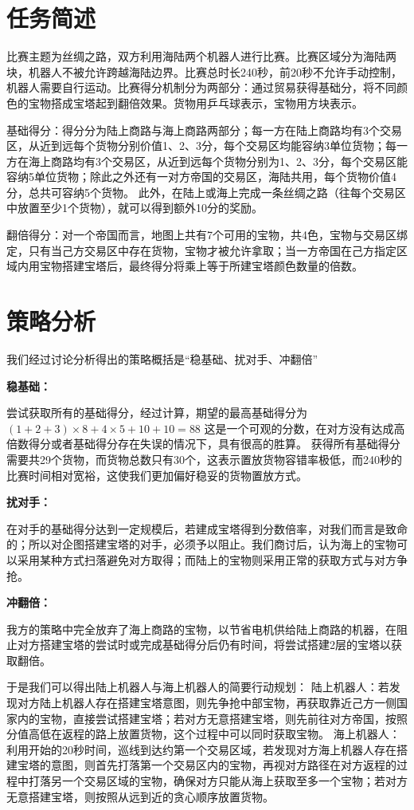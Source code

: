 \documentclass{Robot}
\date{\today}
\begin{document}
    \makecover
 
    \section{任务简述}

    比赛主题为丝绸之路，双方利用海陆两个机器人进行比赛。比赛区域分为海陆两块，机器人不被允许跨越海陆边界。比赛总时长240秒，前20秒不允许手动控制，机器人需要自行运动。比赛得分机制分为两部分：通过贸易获得基础分，将不同颜色的宝物搭成宝塔起到翻倍效果。货物用乒乓球表示，宝物用方块表示。
    \par
    基础得分：得分分为陆上商路与海上商路两部分；每一方在陆上商路均有3个交易区，从近到远每个货物分别价值1、2、3分，每个交易区均能容纳3单位货物；每一方在海上商路均有3个交易区，从近到远每个货物分别为1、2、3分，每个交易区能容纳5单位货物；除此之外还有一对方帝国的交易区，海陆共用，每个货物价值4分，总共可容纳5个货物。
    此外，在陆上或海上完成一条丝绸之路（往每个交易区中放置至少1个货物），就可以得到额外10分的奖励。
    \par
    翻倍得分：对一个帝国而言，地图上共有7个可用的宝物，共4色，宝物与交易区绑定，只有当己方交易区中存在货物，宝物才被允许拿取；当一方帝国在己方指定区域内用宝物搭建宝塔后，最终得分将乘上等于所建宝塔颜色数量的倍数。

    \section{策略分析}

    我们经过讨论分析得出的策略概括是“稳基础、扰对手、冲翻倍”
    \par
    \textbf{稳基础：}
    \par
    尝试获取所有的基础得分，经过计算，期望的最高基础得分为$\left(1+2+3\right)\times 8+ 4\times 5+10+10=88$
    这是一个可观的分数，在对方没有达成高倍数得分或者基础得分存在失误的情况下，具有很高的胜算。
    获得所有基础得分需要共29个货物，而货物总数只有30个，这表示置放货物容错率极低，而240秒的比赛时间相对宽裕，这使我们更加偏好稳妥的货物置放方式。
    \par
    \textbf{扰对手：}
    \par
    在对手的基础得分达到一定规模后，若建成宝塔得到分数倍率，对我们而言是致命的；所以对企图搭建宝塔的对手，必须予以阻止。我们商讨后，认为海上的宝物可以采用某种方式扫落避免对方取得；而陆上的宝物则采用正常的获取方式与对方争抢。
    \par
    \textbf{冲翻倍：}
    \par
    我方的策略中完全放弃了海上商路的宝物，以节省电机供给陆上商路的机器，在阻止对方搭建宝塔的尝试时或完成基础得分后仍有时间，将尝试搭建2层的宝塔以获取翻倍。
    \par
    于是我们可以得出陆上机器人与海上机器人的简要行动规划：
    陆上机器人：若发现对方陆上机器人存在搭建宝塔意图，则先争抢中部宝物，再获取靠近己方一侧国家内的宝物，直接尝试搭建宝塔；若对方无意搭建宝塔，则先前往对方帝国，按照分值高低在返程的路上放置货物，这个过程中可以同时获取宝物。
    海上机器人： 利用开始的20秒时间，巡线到达约第一个交易区域，若发现对方海上机器人存在搭建宝塔的意图，则首先打落第一个交易区内的宝物，再视对方路径在对方返程的过程中打落另一个交易区域的宝物，确保对方只能从海上获取至多一个宝物；若对方无意搭建宝塔，则按照从远到近的贪心顺序放置货物。
\end{document}
